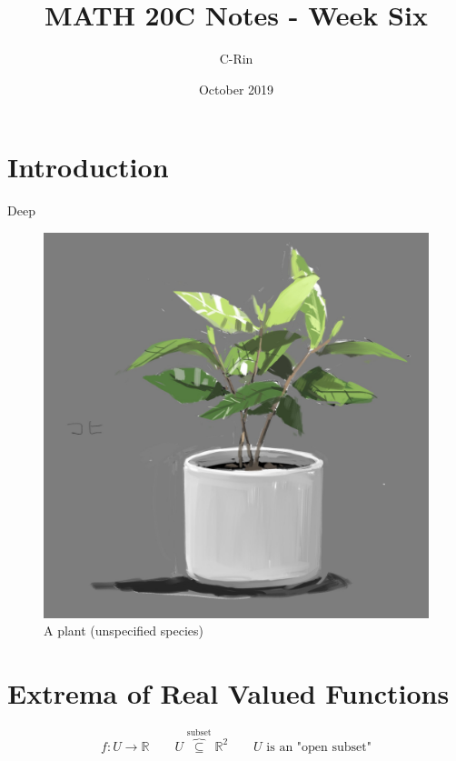\documentclass{article}
\title{MATH 20C Notes - Week Six}
\author{C-Rin}
\date{October 2019}
\begin{document}
\maketitle

\section*{Introduction}
Deep 

\begin{figure}[h!]
\centering
\includegraphics[scale=0.1]{plant.jpg}
\caption{A plant (unspecified species)}
\end{figure}


\newpage
\section{Extrema of Real Valued Functions}
\[f:U\rightarrow\mathbb{R} \qquad  U\overbrace{\subseteq}^{\mbox{subset}} \mathbb{R}^2 \qquad U\mbox{ is an "open subset"}\]
\end{document}
